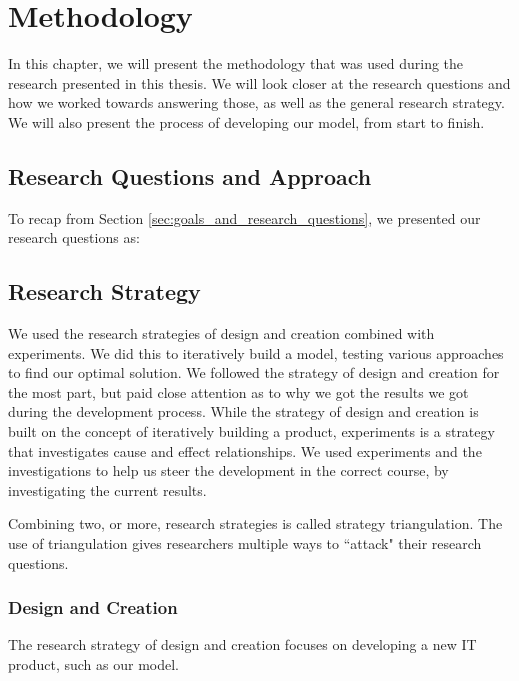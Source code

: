 
\chapter{Methodology}
\label{ch:methodology}
In this chapter, we will present the methodology that was used during the research presented in this thesis. We will look closer at the research questions and how we worked towards answering those, as well as the general research strategy. We will also present the process of developing our model, from start to finish.


\section{Research Questions and Approach}
To recap from Section \ref{sec:goals_and_research_questions}, we presented our research questions as:





\section{Research Strategy}
We used the research strategies of design and creation combined with experiments. We did this to iteratively build a model, testing various approaches to find our optimal solution. We followed the strategy of design and creation for the most part, but paid close attention as to why we got the results we got during the development process. While the strategy of design and creation is built on the concept of iteratively building a product, experiments is a strategy that investigates cause and effect relationships. We used experiments and the investigations to help us steer the development in the correct course, by investigating the current results.

Combining two, or more, research strategies is called strategy triangulation. The use of triangulation gives researchers multiple ways to ``attack" their research questions. 

\subsection{Design and Creation}
The research strategy of design and creation focuses on developing a new IT product, such as our model.

